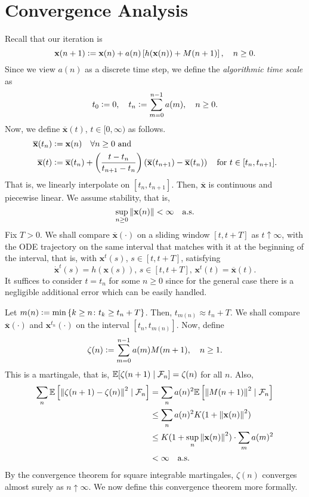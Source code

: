 \section{Convergence Analysis}

Recall that our iteration is
\[
    \mathbf{x}(n+1) \vcentcolon= \mathbf{x}(n) + a(n) \left[ h(\mathbf{x}(n)) + M(n+1) \right], \quad n \geq 0.
\]
Since we view $a(n)$ as a discrete time step, we define the \emph{algorithmic time scale} as
\[
    t_0 \vcentcolon= 0, \quad t_n \vcentcolon= \sum_{m=0}^{n-1} a(m), \quad n \geq 0.
\]
Now, we define $\overline{\mathbf{x}}(t)$, $t \in [0,\infty)$ as follows. 
\begin{align*}
    \overline{\mathbf{x}}(t_n) &\vcentcolon= \mathbf{x}(n) \quad \forall n \geq 0 \text{ and} \\
    \overline{\mathbf{x}}(t) &\vcentcolon= \overline{\mathbf{x}}(t_n) + \left( \frac{t - t_n}{t_{n+1} - t_n} \right) \left( \overline{\mathbf{x}}(t_{n+1}) - \overline{\mathbf{x}}(t_n) \right) \quad \text{for } t \in [t_n, t_{n+1}].
\end{align*}
That is, we linearly interpolate on $[t_n, t_{n+1}]$. Then, $\overline{\mathbf{x}}$ is continuous and piecewise linear. We assume stability, that is,
\[
    \sup_{n \geq 0} \norm{\mathbf{x}(n)} < \infty \quad \text{a.s.}
\]
Fix $T > 0$. We shall compare $\overline{\mathbf{x}}(\cdot)$ on a sliding window $[t,t+T]$ as $t \uparrow \infty$, with the ODE trajectory on the same interval that matches with it at the beginning of the interval, that is, with $\mathbf{x}^t(s)$, $s \in [t,t+T]$, satisfying
\[
    \dot{\mathbf{x}}^t(s) = h(\mathbf{x}(s)), \, s \in [t,t+T], \, \mathbf{x}^t(t) = \overline{\mathbf{x}}(t).
\]
It suffices to consider $t = t_n$ for some $n \geq 0$ since for the general case there is a negligible additional error which can be easily handled. 

Let $m(n) \vcentcolon= \min \left\{ k \geq n \colon t_k \geq t_n + T \right\}$. Then, $t_{m(n)} \approx t_n + T$. We shall compare $\overline{\mathbf{x}}(\cdot)$ and $\mathbf{x}^{t_n}(\cdot)$ on the interval $[t_n, t_{m(n)}]$. Now, define
\[
    \zeta(n) \vcentcolon= \sum_{m=0}^{n-1} a(m) M(m+1), \quad n \geq 1.
\]
This is a martingale, that is, $\mathbb{E}[\zeta(n+1) \mid \mathcal{F}_n] = \zeta(n)$ for all $n$. Also, 
\begin{align*}
    \sum_n \mathbb{E} \left[ \norm{\zeta(n+1) - \zeta(n)}^2 \mid \mathcal{F}_n \right] &= \sum_n a(n)^2 \mathbb{E} \left[ \norm{M(n+1)}^2 \mid \mathcal{F}_n \right] \\
    &\leq \sum_n a(n)^2 K (1 + \norm{\mathbf{x}(n)}^2) \\
    &\leq K (1 + \sup_n\norm{\mathbf{x}(n)}^2) \cdot \sum_m a(m)^2 \\
    &< \infty \quad \text{a.s.}
\end{align*}
By the convergence theorem for square integrable martingales, $\zeta(n)$ converges almost surely as $n \uparrow \infty$. We now define this convergence theorem more formally. 

